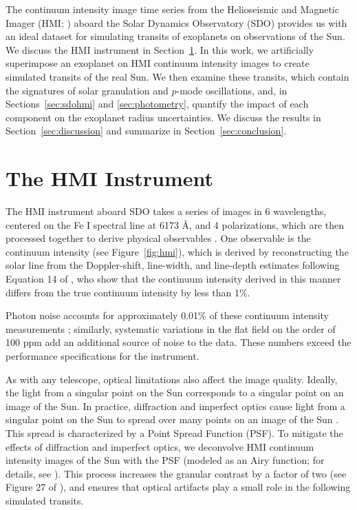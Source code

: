 The continuum intensity image time series from the Helioseismic and Magnetic Imager (HMI; \citealt{schou12}) aboard the Solar Dynamics Observatory (SDO) provides us with an ideal dataset for simulating transits of exoplanets on observations of the Sun. We discuss the HMI instrument in Section~\ref{sec:hmi}. In this work, we artificially superimpose an exoplanet on HMI continuum intensity images to create simulated transits of the real Sun. We then examine these transits, which contain the signatures of solar granulation and $p$-mode oscillations, and, in Sections~\ref{sec:sdohmi} and \ref{sec:photometry}, quantify the impact of each component on the exoplanet radius uncertainties. We discuss the results in Section~\ref{sec:discussion} and summarize in Section~\ref{sec:conclusion}.

\section{The HMI Instrument} 
\label{sec:hmi}
The HMI instrument aboard SDO takes a series of images in 6 wavelengths, centered on the Fe I spectral line at 6173 \AA, and 4 polarizations, which are then processed together to derive physical observables \citep{schou12}. One observable is the continuum intensity (see Figure~\ref{fig:hmi}), which is derived by reconstructing the solar line from the Doppler-shift, line-width, and line-depth estimates following Equation 14 of \citet{couvidat16}, who show that the continuum intensity derived in this manner differs from the true continuum intensity by less than 1\%.

Photon noise accounts for approximately 0.01\% of these continuum intensity measurements \citep{couvidat16}; similarly, systematic variations in the flat field on the order of 100 ppm add an additional source of noise to the data. These numbers exceed the performance specifications for the instrument.

As with any telescope, optical limitations also affect the image quality. Ideally, the light from a singular point on the Sun corresponds to a singular point on an image of the Sun. In practice, diffraction and imperfect optics cause light from a singular point on the Sun to spread over many points on an image of the Sun \citep{couvidat16}. This spread is characterized by a Point Spread Function (PSF). To mitigate the effects of diffraction and imperfect optics, we deconvolve HMI continuum intensity images of the Sun with the PSF (modeled as an Airy function; for details, see \citealt{wachter12}). This process increases the granular contrast by a factor of two (see Figure 27 of \citealp{couvidat16}), and ensures that optical artifacts play a small role in the following simulated transits. 

